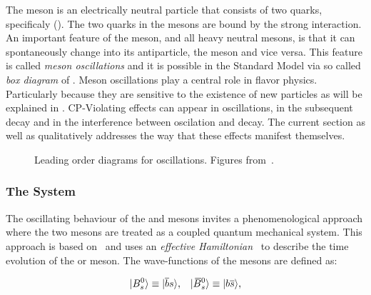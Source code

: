 The \Bs meson is an electrically neutral particle that consists of two quarks, specificaly (\bquarkbar\squark).
The two quarks in the mesons are bound by the strong interaction. An important feature of
the \Bs meson, and all heavy neutral mesons, is that it can spontaneously change into its antiparticle,
the \Bsb meson and vice versa. This feature is called {\it meson oscillations} and it is possible
in the Standard Model via so called {\it box diagram} of .
Meson oscillations play a central role in flavor physics. Particularly because they are sensitive to the
existence of new particles as will be explained in . CP-Violating effects can
appear in \BBbarSyst oscillations, in the subsequent decay and in the interference between oscilation
and decay. The current section as well as  qualitatively addresses the way that
these effects manifest themselves.

\begin{figure}[!h]
  \centering
  \begin{subfigure}{0.5\textwidth}
    \centering
    \scalebox{0.9}{\sffamily }
    \caption{}
    \label{bs_box_1}
  \end{subfigure}%
  \begin{subfigure}{0.5\textwidth}
    \centering
    \scalebox{0.9}{\sffamily }
    \caption{}
    \label{bs_box_2}
  \end{subfigure}
  \caption{Leading order diagrams for \BBbarSyst oscillations. Figures from~\cite{jeroenThesis}.}
  \label{bs_box}
\end{figure}

\subsubsection{The \BBbarSyst System}
\label{the_bbar_system}

The oscillating behaviour of the \Bs and \Bsb mesons invites a phenomenological approach
where the two mesons are treated as a coupled quantum mechanical system. This approach
is based on~\cite{Weisskopf:1930au,Weisskopf:1930ps} and uses an {\it effective Hamiltonian}~\cite{eff-hamiltonian-bs-syst,DeBruyn-thesis}
to describe the time evolution of the \Bs or \Bsb meson. The wave-functions of the mesons
are defined as:

\begin{equation}
  \centering
  \ket{\Bs}  \equiv  \ket{\bquarkbar\squark}, \;\;\; \ket{\Bsb} \equiv  \ket{\bquark\squarkbar},
  \label{bs_wavefunctions}
\end{equation}

